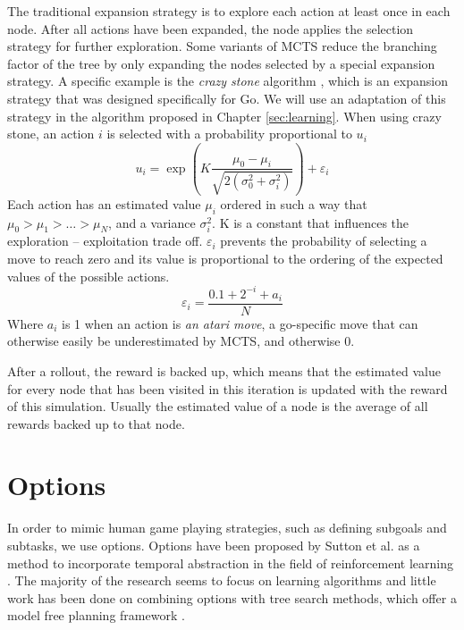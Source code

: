 The traditional expansion strategy is to explore each action at least once in
each node. After all actions have been expanded, the node applies the selection
strategy for further exploration. Some variants of MCTS reduce the branching
factor of the tree by only expanding the nodes selected by a special expansion
strategy. A specific example is the \emph{crazy stone} algorithm
\cite{coulom2007efficient}, which is an expansion strategy that was designed
specifically for Go. We will use an adaptation of this strategy in the algorithm
proposed in Chapter \ref{sec:learning}.  When using crazy stone, an action $i$
is selected with a probability proportional to $u_i$
\begin{equation}
	\label{eq:crazystone}
	u_i = \exp\left(K \frac{\mu_0 - \mu_i}{\sqrt{2\left(\sigma_0^2 +
\sigma_i^2\right)}}\right) + \varepsilon_i
\end{equation}
Each action has an estimated value $\mu_i$ ordered in such a way that $\mu_0 >
\mu_1 > \ldots > \mu_N$, and a variance $\sigma_i^2$. K is a constant
that influences the exploration -- exploitation trade off. $\varepsilon_i$ prevents
the probability of selecting a move to reach zero and its value is proportional
to the ordering of the expected values of the possible actions. 
\begin{equation}
	\label{eq:epsilon}
	\varepsilon_i = \frac{0.1 + 2^{-i} + a_i}{N}
\end{equation}
Where $a_i$ is 1 when an action is \emph{an atari move}, a go-specific
move that can otherwise easily be underestimated by MCTS, and otherwise 0.

After a rollout, the reward is backed up, which means that the estimated value
for every node that has been visited in this iteration is updated with the
reward of this simulation. Usually the estimated value of a node is the average
of all rewards backed up to that node.


\section{Options}
\label{subsec:options}

In order to mimic human game playing strategies, such as defining subgoals and
subtasks, we use options. Options have been proposed by Sutton et al.  as a
method to incorporate temporal abstraction in the field of reinforcement
learning \cite{sutton1999between}. The majority of the research seems to focus
on learning algorithms and little work has been done on combining options with
tree search methods, which offer a model free planning framework
\cite{barto2003recent}.

